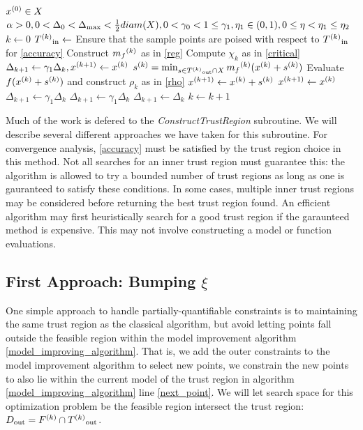 \begin{algorithmic}

\State $x^{(0)} \in X$
\State $\alpha > 0, 0 < \Delta_0 < \Delta_{\text{max}} < \frac 1 2 diam(X), 0 < \gamma_{0} < 1 \le \gamma_{1}, \eta_1 \in (0,1), 0 \le \eta < \eta_1 \le \eta_2$
\State $k \gets 0$
\Loop
    \State ${T^{(k)}}_{\text{in}}\gets $ 
    \State Ensure that the sample points are poised with respect to ${T^{(k)}}_{\text{in}}$ for \ref{accuracy}
    \State Construct ${{m}_f}^{(k)}$ as in \ref{reg}
    \State Compute $\chi_k$ as in \ref{critical}
        \State $\Delta_{k+1} \gets \gamma_1 \Delta_{k}, x^{(k+1)} \gets {x}^{(k)}$
    \Else
        \State ${s}^{(k)} = \min_{s \in {T^{(k)}}_{\text{out}} \cap X} {{m}_f}^{(k)}({x}^{(k)} + {s}^{(k)})$
        \State Evaluate $f({x}^{(k)} + {s}^{(k)})$ and construct $\rho_k$ as in \ref{rho}
            \State $ {x}^{(k+1)} \gets {x}^{(k)} + {s}^{(k)}$
        \Else
            \State ${x}^{(k+1)} \gets {x}^{(k)} $
        \EndIf
            \State $\Delta_{k+1} \gets \gamma_1\Delta_k$
        \Else
                \State $\Delta_{k+1} \gets \gamma_1\Delta_k$
            \Else
                \State $\Delta_{k+1} \gets \Delta_{k}$
            \EndIf
        \EndIf
    \EndIf
    \State $k \gets k+1$
\EndLoop
\end{algorithmic}

Much of the work is defered to the \emph{ConstructTrustRegion} subroutine.
We will describe several different approaches we have taken for this subroutine.
For convergence analysis, \ref{accuracy} must be satisfied by the trust region choice in this method.
Not all searches for an inner trust region must guarantee this: the algorithm is allowed to try a bounded number of trust regions as long as one is gauranteed to satisfy these conditions.
In some cases, multiple inner trust regions may be considered before returning the best trust region found.
An efficient algorithm may first heuristically search for a good trust region if the garaunteed method is expensive.
This may not involve constructing a model or function evaluations.


\subsection{First Approach: Bumping $\xi$}
One simple approach to handle partially-quantifiable constraints is to maintaining the same trust region as the classical algorithm, but avoid letting points fall outside the feasible region within the model improvement algorithm \ref{model_improving_algorithm}.
That is, we add the outer constraints to the model improvement algorithm to select new points, we constrain the new points to also lie within the current model of the trust region in algorithm \ref{model_improving_algorithm} line \ref{next_point}.
We will let search space for this optimization problem be the feasible region intersect the trust region: $D_{\text{out}} = {F}^{(k)} \cap {T^{(k)}}_{\text{out}} $.

